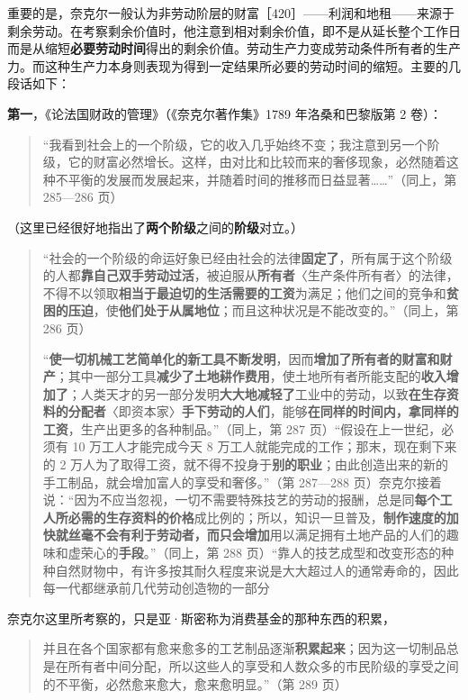重要的是，奈克尔一般认为非劳动阶层的财富［420］——利润和地租——来源于剩余劳动。在考察剩余价值时，他注意到相对剩余价值，即不是从延长整个工作日而是从缩短\textbf{必要劳动时间}得出的剩余价值。劳动生产力变成劳动条件所有者的生产力。而这种生产力本身则表现为得到一定结果所必要的劳动时间的缩短。主要的几段话如下：

\textbf{第一}，《论法国财政的管理》（《奈克尔著作集》1789 年洛桑和巴黎版第 2 卷）：

\begin{quote}“我看到社会上的一个阶级，它的收入几乎始终不变；我注意到另一个阶级，它的财富必然增长。这样，由对比和比较而来的奢侈现象，必然随着这种不平衡的发展而发展起来，并随着时间的推移而日益显著……”（同上，第 285—286 页）\end{quote}

（这里已经很好地指出了\textbf{两个阶级}之间的\textbf{阶级}对立。）

\begin{quote}“社会的一个阶级的命运好象已经由社会的法律\textbf{固定了}，所有属于这个阶级的人都\textbf{靠自己双手劳动过活}，被迫服从\textbf{所有者}〈生产条件所有者〉的法律，不得不以领取\textbf{相当于最迫切的生活需要的工资}为满足；他们之间的竞争和\textbf{贫困的压迫}，使\textbf{他们处于从属地位}；而且这种状况是不能改变的。”（同上，第 286 页）

“\textbf{使一切机械工艺简单化的新工具不断发明}，因而\textbf{增加了所有者的财富和财产}；其中一部分工具\textbf{减少了土地耕作费用}，使土地所有者所能支配的\textbf{收入增加了}；人类天才的另一部分发明\textbf{大大地减轻了}工业中的劳动，以致\textbf{在生存资料的分配者}〈即资本家〉\textbf{手下劳动的人们}，能够\textbf{在同样的时间内，拿同样的工资}，生产出更多的各种制品。”（同上，第 287 页）“假设在上一世纪，必须有 10 万工人才能完成今天 8 万工人就能完成的工作；那末，现在剩下来的 2 万人为了取得工资，就不得不投身于\textbf{别的职业}；由此创造出来的新的手工制品，就会增加富人的享受和奢侈。”（第 287—288 页）奈克尔接着说：“因为不应当忽视，一切不需要特殊技艺的劳动的报酬，总是同\textbf{每个工人所必需的生存资料的价格}成比例的；所以，知识一旦普及，\textbf{制作速度的加快就丝毫不会有利于劳动者，而只会增加}用以满足拥有土地产品的人们的趣味和虚荣心的\textbf{手段}。”（同上，第 288 页）“靠人的技艺成型和改变形态的种种自然财物中，有许多按其耐久程度来说是大大超过人的通常寿命的，因此每一代都继承前几代劳动创造物的一部分\end{quote}

\fontbox{~\{}奈克尔这里所考察的，只是亚·斯密称为消费基金的那种东西的积累\fontbox{\}~}，

\begin{quote}并且在各个国家都有愈来愈多的工艺制品逐渐\textbf{积累起来}；因为这一切制品总是在所有者中间分配，所以这些人的享受和人数众多的市民阶级的享受之间的不平衡，必然愈来愈大，愈来愈明显。”（第 289 页）\end{quote}

